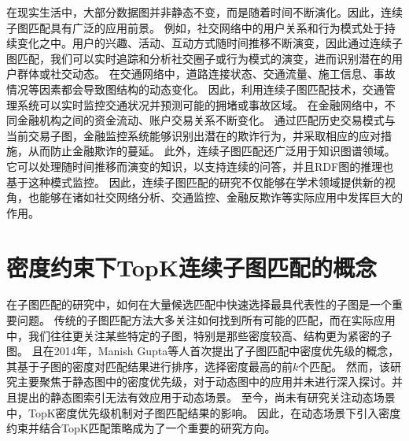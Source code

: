 在现实生活中，大部分数据图并非静态不变，而是随着时间不断演化。因此，连续子图匹配具有广泛的应用前景。
例如，社交网络中的用户关系和行为模式处于持续变化之中。用户的兴趣、活动、互动方式随时间推移不断演变，因此通过连续子图匹配，我们可以实时追踪和分析社交圈子或行为模式的演变，进而识别潜在的用户群体或社交动态。
在交通网络中，道路连接状态、交通流量、施工信息、事故情况等因素都会导致图结构的动态变化\cite{traffic-graph-matching-DBLP:journals/pvldb/SongGCW14}。
因此，利用连续子图匹配技术，交通管理系统可以实时监控交通状况并预测可能的拥堵或事故区域。
在金融网络中，不同金融机构之间的资金流动、账户交易关系不断变化\cite{csm-timing-DBLP:conf/icde/Li0O019}。
通过匹配历史交易模式与当前交易子图，金融监控系统能够识别出潜在的欺诈行为，并采取相应的应对措施，从而防止金融欺诈的蔓延。
此外，连续子图匹配还广泛用于知识图谱领域。它可以处理随时间推移而演变的知识，以支持连续的问答\cite{barbieri2010c}，并且RDF图的推理也基于这种模式监控\cite{dell2014incremental}。
因此，连续子图匹配的研究不仅能够在学术领域提供新的视角，也能够在诸如社交网络分析、交通监控、金融反欺诈等实际应用中发挥巨大的作用。

\section{密度约束下TopK连续子图匹配的概念}
在子图匹配的研究中，如何在大量候选匹配中快速选择最具代表性的子图是一个重要问题。
传统的子图匹配方法大多关注如何找到所有可能的匹配，而在实际应用中，我们往往更关注某些特定的子图，特别是那些密度较高、结构更为紧密的子图。
且在2014年，Manish Gupta等人首次提出了子图匹配中密度优先级的概念\cite{static-topk-Gupta-DBLP:conf/icde/GuptaGYCH14}，其基于子图的密度对匹配结果进行排序，选择密度最高的前$k$个匹配。
然而，该研究主要聚焦于静态图中的密度优先级，对于动态图中的应用并未进行深入探讨。并且提出的静态图索引无法有效应用于动态场景。
至今，尚未有研究关注动态场景中，TopK密度优先级机制对子图匹配结果的影响。
因此，在动态场景下引入密度约束并结合TopK匹配策略成为了一个重要的研究方向。

